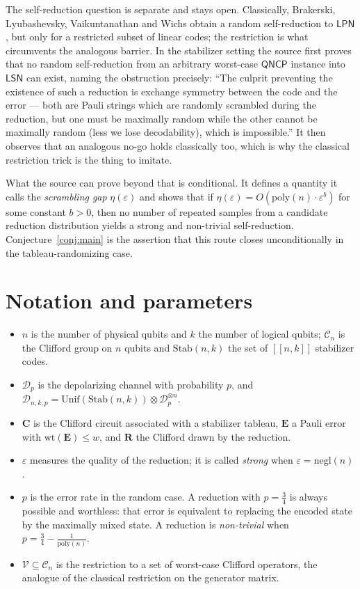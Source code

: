 \documentclass{conjura-conjecture}
\newcommand{\eps}{\varepsilon}
\newcommand{\LSN}{\mathsf{LSN}}
\newcommand{\LPN}{\mathsf{LPN}}
\newcommand{\QNCP}{\mathsf{QNCP}}
\newcommand{\Cliff}{\mathcal{C}}
\begin{document}
The self-reduction question is separate and stays open. Classically,
Brakerski, Lyubashevsky, Vaikuntanathan and Wichs obtain a random
self-reduction to $\LPN$, but only for a restricted subset of linear
codes; the restriction is what circumvents the analogous barrier. In the
stabilizer setting the source first proves that no random self-reduction
from an arbitrary worst-case $\QNCP$ instance into $\LSN$ can exist,
naming the obstruction precisely: ``The culprit preventing the existence
of such a reduction is exchange symmetry between the code and the
error --- both are Pauli strings which are randomly scrambled during the
reduction, but one must be maximally random while the other cannot be
maximally random (less we lose decodability), which is impossible.'' It
then observes that an analogous no-go holds classically too, which is why
the classical restriction trick is the thing to imitate.

What the source can prove beyond that is conditional. It defines a
quantity it calls the \emph{scrambling gap} $\eta(\eps)$ and shows that
if $\eta(\eps) = O(\mathrm{poly}(n)\cdot\eps^{b})$ for some constant $b >
0$, then no number of repeated samples from a candidate reduction
distribution yields a strong and non-trivial self-reduction.
Conjecture~\ref{conj:main} is the assertion that this route closes
unconditionally in the tableau-randomizing case.

\section{Notation and parameters}\label{sec:notation}

\begin{itemize}[nosep]
  \item $n$ is the number of physical qubits and $k$ the number of
    logical qubits; $\Cliff_{n}$ is the Clifford group on $n$ qubits and
    $\mathrm{Stab}(n,k)$ the set of $[\![n,k]\!]$ stabilizer codes.
  \item $\mathcal{D}_{p}$ is the depolarizing channel with probability
    $p$, and $\mathcal{D}_{n,k,p} = \mathrm{Unif}(\mathrm{Stab}(n,k))
    \otimes \mathcal{D}_{p}^{\otimes n}$.
  \item $\mathbf{C}$ is the Clifford circuit associated with a stabilizer
    tableau, $\mathbf{E}$ a Pauli error with $\mathrm{wt}(\mathbf{E}) \le
    w$, and $\mathbf{R}$ the Clifford drawn by the reduction.
  \item $\eps$ measures the quality of the reduction; it is called
    \emph{strong} when $\eps = \mathrm{negl}(n)$.
  \item $p$ is the error rate in the random case. A reduction with $p =
    \frac{3}{4}$ is always possible and worthless: that error is
    equivalent to replacing the encoded state by the maximally mixed
    state. A reduction is \emph{non-trivial} when $p = \frac{3}{4} -
    \frac{1}{\mathrm{poly}(n)}$.
  \item $\mathcal{V} \subseteq \Cliff_{n}$ is the restriction to a set of
    worst-case Clifford operators, the analogue of the classical
    restriction on the generator matrix.
\end{itemize}
\end{document}
